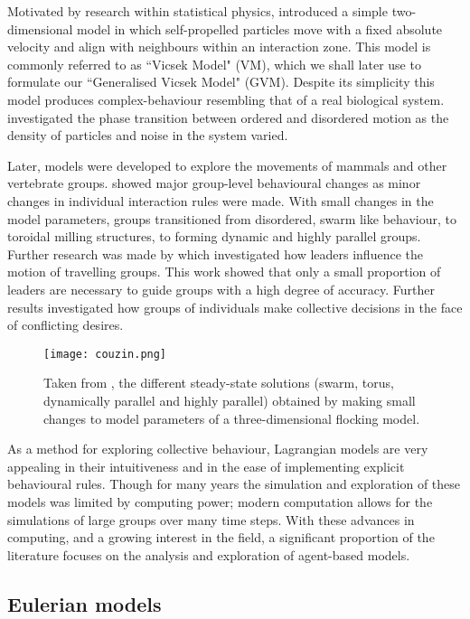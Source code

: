 Motivated by research within statistical physics, \citet{vicsek95} introduced a simple two-dimensional model in which self-propelled particles move with a fixed absolute velocity and align with neighbours within an interaction zone. This model is commonly referred to as ``Vicsek Model" (VM), which we shall later use to formulate our ``Generalised Vicsek Model" (GVM). Despite its simplicity this model produces complex-behaviour resembling that of a real biological system. \citet{vicsek95} investigated the phase transition between ordered and disordered motion as the density of particles and noise in the system varied.

Later, models were developed to explore the movements of mammals and other vertebrate groups. \citet{couzin02} showed major group-level behavioural changes as minor changes in individual interaction rules were made. With small changes in the model parameters, groups transitioned from disordered, swarm like behaviour, to toroidal milling structures, to forming dynamic and highly parallel groups. Further research was made by \citet{couzin05} which investigated how leaders influence the motion of travelling groups. This work showed that only a small proportion of leaders are necessary to guide groups with a high degree of accuracy. Further results investigated how groups of individuals make collective decisions in the face of conflicting desires.

\begin{figure}[!htbp]
	\texttt{[image: couzin.png]}
	\caption{Taken from \citet{couzin02}, the different steady-state solutions (swarm, torus, dynamically parallel and highly parallel) obtained by making small changes to model parameters of a three-dimensional flocking model.}
	\label{fig:couzin}
\end{figure}

As a method for exploring collective behaviour, Lagrangian models are very appealing in their intuitiveness and in the ease of implementing explicit behavioural rules. Though for many years the simulation and exploration of these models was limited by computing power; modern computation allows for the simulations of large groups over many time steps. With these advances in computing, and a growing interest in the field, a significant proportion of the literature focuses on the analysis and exploration of agent-based models.

\subsection{Eulerian models}
\label{ssec:eulerian_models}

